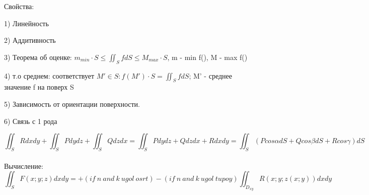 \documentclass{article}
\begin{document}
Свойства:

1) Линейность

2) Аддитивность

3) Теорема об оценке: $m_{min} \cdot S \leq \iint_S fdS\leq M_{max}\cdot S$, m - min f(), M - max f()

4) т.о среднем: соответствует $M'\in S: f(M')\cdot S = \iint_S fdS$; M' - среднее значение f на поверх S

5) Зависимость от ориентации поверхности.

6) Связь с 1 рода 

\begin{equation*}
    \iint_S Rdxdy + \iint_S P dy dz +\iint_S Q dzdx = \iint_S Pdydz + Qdzdx +Rdxdy = \iint_S (Pcos\alpha dS + Qcos\beta dS + Rcos\gamma)dS
\end{equation*}
\\
Вычисление:
\begin{equation*}
    \iint_S F(x;y;z)dxdy = +(if\ n\ and \ k \ ugol\ osrt)-(if\ n\ and\ k\  ugol\ tupoy)\iint_{D_{xy}}R(x;y;z(x;y))dxdy 
\end{equation*}
    
\end{document}
